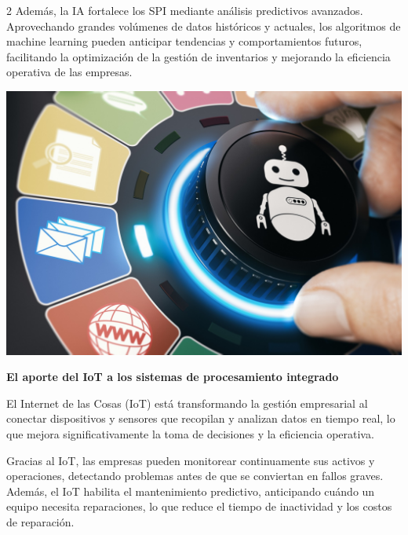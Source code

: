 \documentclass[12pt,spanish,Letterpaper,openany]{book}
\begin{document}
\begin {multicols}{2}
Además, la IA fortalece los SPI mediante análisis predictivos avanzados. Aprovechando grandes volúmenes de datos históricos y actuales, los algoritmos de machine learning pueden anticipar tendencias y comportamientos futuros, facilitando la optimización de la gestión de inventarios y mejorando la eficiencia operativa de las empresas.

\begin {flushleft}
\noindent\begin{minipage}[c]{\columnwidth}

\begin{center}\includegraphics[width=1\linewidth]{imagenes_articulos/sp47_01} \end{center}

\end{minipage}
\end {flushleft}

\textbf{El aporte del IoT a los sistemas de procesamiento integrado}

El Internet de las Cosas (IoT) está transformando la gestión empresarial al conectar dispositivos y sensores que recopilan y analizan datos en tiempo real, lo que mejora significativamente la toma de decisiones y la eficiencia operativa.

Gracias al IoT, las empresas pueden monitorear continuamente sus activos y operaciones, detectando problemas antes de que se conviertan en fallos graves. Además, el IoT habilita el mantenimiento predictivo, anticipando cuándo un equipo necesita reparaciones, lo que reduce el tiempo de inactividad y los costos de reparación.

\begin {flushleft}
\noindent\begin{minipage}[c]{\columnwidth}


\end{minipage}
\end{flushleft}
\end{multicols}
\end{document}
